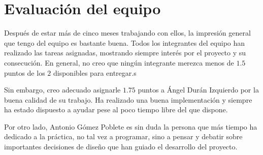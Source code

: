 \chapter{Evaluación del equipo}

Después de estar más de cinco meses trabajando con ellos, la impresión general
que tengo del equipo es bastante buena. Todos los integrantes del equipo han
realizado las tareas asignadas, mostrando siempre interés por el proyecto y su
consecución. En general, no creo que ningún integrante merezca menos de $1.5$
puntos de los $2$ disponibles para entregar.s

Sin embargo, creo adecuado asignarle $1.75$ puntos a Ángel Durán Izquierdo por
la buena calidad de su trabajo. Ha realizado una buena implementación y siempre
ha estado dispuesto a ayudar pese al poco tiempo libre del que dispone.

Por otro lado, Antonio Gómez Poblete es sin duda la persona que más tiempo ha
dedicado a la práctica, no tal vez a programar, sino a pensar y debatir sobre
importantes decisiones de diseño que han guiado el desarrollo del proyecto.
